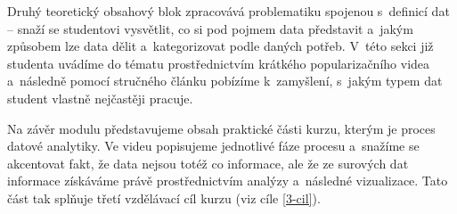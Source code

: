 Druhý teoretický obsahový blok zpracovává problematiku spojenou s~definicí dat -- snaží se studentovi vysvětlit, co si pod pojmem data představit a~jakým způsobem lze data dělit a~kategorizovat podle daných potřeb. V~této sekci již studenta uvádíme do tématu prostřednictvím krátkého popularizačního videa a~následně pomocí stručného článku pobízíme k~zamyšlení, s~jakým typem dat student vlastně nejčastěji pracuje.

Na závěr modulu představujeme obsah praktické části kurzu, kterým je proces datové analytiky. Ve videu popisujeme jednotlivé fáze procesu a~snažíme se akcentovat fakt, že data nejsou totéž co informace, ale že ze surových dat informace získáváme právě prostřednictvím analýzy a~následné vizualizace. Tato část tak splňuje třetí vzdělávací cíl kurzu (viz cíle \ref{3-cil}).
